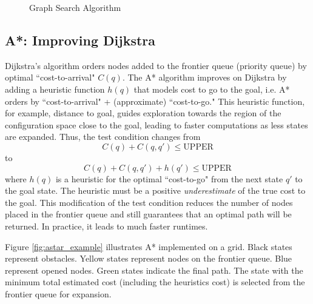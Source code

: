 \documentclass[twoside]{article}
\begin{document}
\begin{figure}[h]
\begin{center}
\caption{Graph Search Algorithm}
\label{fig:graph_search}
\end{center}
\end{figure}

\subsection{A*: Improving Dijkstra}
Dijkstra's algorithm orders nodes added to the frontier queue (priority queue) by optimal ``cost-to-arrival" $C(q)$. The A* algorithm improves on Dijkstra by adding a heuristic function $h(q)$ that models cost to go to the goal, i.e. A* orders by ``cost-to-arrival" + (approximate) ``cost-to-go." This heuristic function, for example, distance to goal, guides exploration towards the region of the configuration space close to the goal, leading to faster computations as less states are expanded. Thus, the test
condition changes from
\[ C(q) + C(q, q') \leq \text{UPPER} \]
to
\[ C(q) + C(q, q') + h(q') \leq \text{UPPER} \] 
where $h(q)$ is a heuristic for the optimal ``cost-to-go" from the next state $q'$ to the goal state. The heuristic must be a positive \textit{underestimate} of the true cost to the goal. This modification of the test condition reduces the number of nodes placed in the frontier queue and still guarantees that an optimal path will be returned. In practice, it leads to much faster runtimes.

Figure \ref{fig:astar_example} illustrates A* implemented on a grid. Black states represent obstacles. Yellow states represent nodes on the frontier queue. Blue represent opened nodes. Green states indicate the final path. The state with the minimum total estimated cost (including the heuristics cost) is selected from the frontier queue for expansion.
\end{document}

